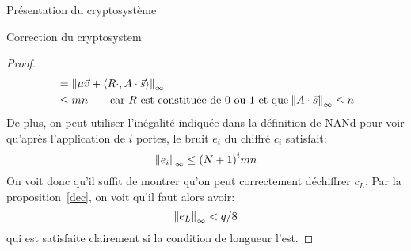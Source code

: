 \begin{section}{Présentation du cryptosystème}
\begin{subsection}{Correction du cryptosystem}
\begin{proof}
\begin{align*}
	&= {\|\mu \vec{v} + \langle R\cdot , A\cdot \vec{s} \rangle\|}_{\infty} \\
	&\leq  m n \qquad \text{car $R$ est constituée de $0$ ou $1$ et que}
	\: {\|A\cdot\vec{s}\|}_{\infty} \leq n
	\end{align*}
	De plus, on peut utiliser l'inégalité indiquée dans la définition de
	NANd pour voir qu'après l'application de $i$ portes, le bruit $e_i$ du
	chiffré  $c_i$ satisfait:
	\[ {\|e_i\|}_{\infty} \leq {(N+1)}^i  mn \]
	On voit donc qu'il suffit de montrer qu'on peut correctement déchiffrer
	$c_L$. Par la proposition~\ref{dec}, on voit qu'il faut alors avoir:
	\[ {\|e_L\|}_{\infty} < q/8 \] 
	qui est satisfaite clairement si la condition de longueur l'est.
	\end{proof}
	\end{subsection}
\end{section}
